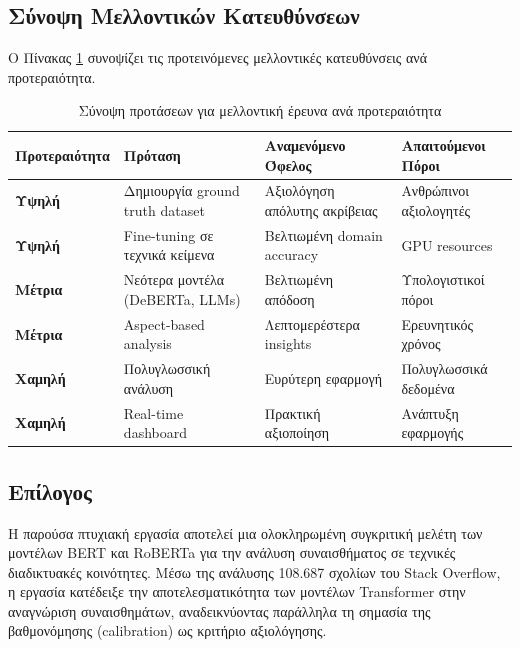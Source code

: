 \documentclass[a4paper,11pt,oneside,openany]{ioniothesis}
\begin{document}
\subsection{Σύνοψη Μελλοντικών Κατευθύνσεων}
\label{sec:Σύνοψη Μελλοντικών Κατευθύνσεων}

Ο Πίνακας \ref{tab:future_work_summary} συνοψίζει τις προτεινόμενες μελλοντικές κατευθύνσεις ανά προτεραιότητα.

\begin{table}[H]
\centering
\caption{Σύνοψη προτάσεων για μελλοντική έρευνα ανά προτεραιότητα}
\label{tab:future_work_summary}
\small
\begin{tabular}{@{}p{2cm}p{4.5cm}p{3.5cm}p{3.5cm}@{}}
\toprule
\textbf{Προτεραιότητα} & \textbf{Πρόταση} & \textbf{Αναμενόμενο Όφελος} & \textbf{Απαιτούμενοι Πόροι} \\
\midrule
\textbf{Υψηλή} & Δημιουργία ground truth dataset & Αξιολόγηση απόλυτης ακρίβειας & Ανθρώπινοι αξιολογητές \\
\midrule
\textbf{Υψηλή} & Fine-tuning σε τεχνικά κείμενα & Βελτιωμένη domain accuracy & GPU resources \\
\midrule
\textbf{Μέτρια} & Νεότερα μοντέλα (DeBERTa, LLMs) & Βελτιωμένη απόδοση & Υπολογιστικοί πόροι \\
\midrule
\textbf{Μέτρια} & Aspect-based analysis & Λεπτομερέστερα insights & Ερευνητικός χρόνος \\
\midrule
\textbf{Χαμηλή} & Πολυγλωσσική ανάλυση & Ευρύτερη εφαρμογή & Πολυγλωσσικά δεδομένα \\
\midrule
\textbf{Χαμηλή} & Real-time dashboard & Πρακτική αξιοποίηση & Ανάπτυξη εφαρμογής \\
\bottomrule
\end{tabular}
\end{table}

\subsection{Επίλογος}
\label{sec:Επίλογος}

Η παρούσα πτυχιακή εργασία αποτελεί μια ολοκληρωμένη συγκριτική μελέτη των μοντέλων BERT και RoBERTa για την ανάλυση συναισθήματος σε τεχνικές διαδικτυακές κοινότητες. Μέσω της ανάλυσης 108.687 σχολίων του Stack Overflow, η εργασία κατέδειξε την αποτελεσματικότητα των μοντέλων Transformer στην αναγνώριση συναισθημάτων, αναδεικνύοντας παράλληλα τη σημασία της βαθμονόμησης (calibration) ως κριτήριο αξιολόγησης.
\end{document}
